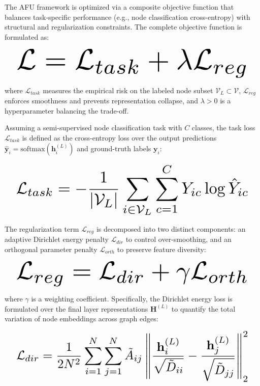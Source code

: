 \documentclass[10pt,twocolumn]{article}
\begin{document}
The \textsc{AFU} framework is optimized via a composite objective function that balances task-specific performance (e.g., node classification cross-entropy) with structural and regularization constraints. The complete objective function is formulated as:

\begin{equation}
\resizebox{0.95\columnwidth}{!}{\ensuremath{\displaystyle \mathcal{L} = \mathcal{L}_{task} + \lambda \mathcal{L}_{reg}}}
\end{equation}

\noindent where $\mathcal{L}_{task}$ measures the empirical risk on the labeled node subset $\mathcal{V}_L \subset \mathcal{V}$, $\mathcal{L}_{reg}$ enforces smoothness and prevents representation collapse, and $\lambda > 0$ is a hyperparameter balancing the trade-off. 

Assuming a semi-supervised node classification task with $C$ classes, the task loss $\mathcal{L}_{task}$ is defined as the cross-entropy loss over the output predictions $\hat{\mathbf{y}}_i = \text{softmax}(\mathbf{h}_i^{(L)})$ and ground-truth labels $\mathbf{y}_i$:

\begin{equation}
\resizebox{0.95\columnwidth}{!}{\ensuremath{\displaystyle \mathcal{L}_{task} = -\frac{1}{|\mathcal{V}_L|} \sum_{i \in \mathcal{V}_L} \sum_{c=1}^{C} Y_{ic} \log \hat{Y}_{ic}}}
\end{equation}

The regularization term $\mathcal{L}_{reg}$ is decomposed into two distinct components: an adaptive Dirichlet energy penalty $\mathcal{L}_{dir}$ to control over-smoothing, and an orthogonal parameter penalty $\mathcal{L}_{orth}$ to preserve feature diversity:

\begin{equation}
\resizebox{0.95\columnwidth}{!}{\ensuremath{\displaystyle \mathcal{L}_{reg} = \mathcal{L}_{dir} + \gamma \mathcal{L}_{orth}}}
\end{equation}

\noindent where $\gamma$ is a weighting coefficient. Specifically, the Dirichlet energy loss is formulated over the final layer representations $\mathbf{H}^{(L)}$ to quantify the total variation of node embeddings across graph edges:

\begin{equation}
\resizebox{0.95\columnwidth}{!}{\ensuremath{\displaystyle \mathcal{L}_{dir} = \frac{1}{2N^2} \sum_{i=1}^{N} \sum_{j=1}^{N} \tilde{A}_{ij} \left\| \frac{\mathbf{h}_i^{(L)}}{\sqrt{\tilde{D}_{ii}}} - \frac{\mathbf{h}_j^{(L)}}{\sqrt{\tilde{D}_{jj}}} \right\|_2^2}}
\end{equation}
\end{document}
